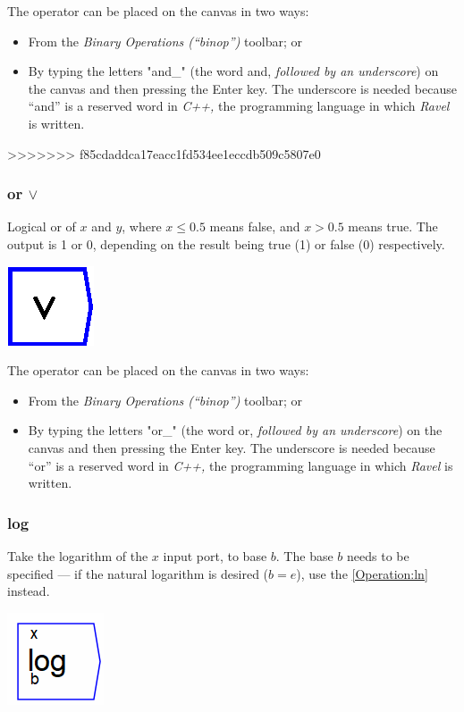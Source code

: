 The operator can be placed on the canvas in two ways:
\begin{itemize}
\item From the \emph{Binary Operations (``binop'') }toolbar; or 
\item By typing the letters "and\_" (the word and, \emph{followed by an
underscore}) on the canvas and then pressing the Enter key. The underscore
is needed because ``and'' is a reserved word in \emph{C++,} the
programming language in which \emph{Ravel} is written.
\end{itemize}
>>>>>>> f85cdaddca17eacc1fd534ee1eccdb509c5807e0

\subsubsection{or $\vee$}

\label{Operation:or_} Logical or of $x$ and $y$, where $x\le0.5$
means false, and $x>0.5$ means true. The output is 1 or 0, depending
on the result being true (1) or false (0) respectively.

\includegraphics{images/or}

The operator can be placed on the canvas in two ways:
\begin{itemize}
\item From the \emph{Binary Operations (``binop'') }toolbar; or 
\item By typing the letters "or\_" (the word or, \emph{followed by an
underscore}) on the canvas and then pressing the Enter key. The underscore
is needed because ``or'' is a reserved word in \emph{C++,} the programming
language in which \emph{Ravel} is written.
\end{itemize}

\subsubsection{log}

\label{Operation:log} Take the logarithm of the $x$ input port,
to base $b$. The base $b$ needs to be specified --- if the natural
logarithm is desired ($b=e$), use the \ref{Operation:ln} instead.

\includegraphics{images/LogKey}

